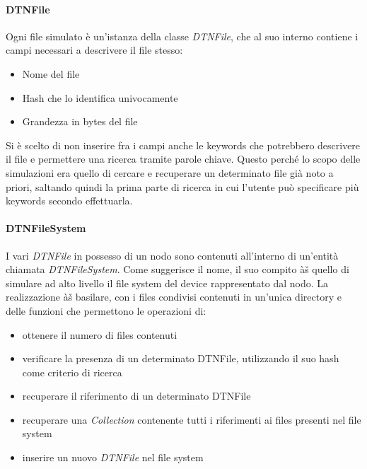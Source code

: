 \paragraph{DTNFile}
Ogni file simulato è un'istanza della classe \textit{DTNFile}, che al suo interno contiene i campi necessari a descrivere il file stesso:

\begin{itemize}
\item Nome del file
\item Hash che lo identifica univocamente
\item Grandezza in bytes del file
\end{itemize}

Si è scelto di non inserire fra i campi anche le keywords che potrebbero descrivere il file e permettere una ricerca tramite parole chiave. Questo perché lo scopo delle simulazioni era quello di cercare e recuperare un determinato file già  noto a priori, saltando quindi la prima parte di ricerca in cui l'utente può specificare più keywords secondo effettuarla.

\paragraph{DTNFileSystem}
I vari \textit{DTNFile} in possesso di un nodo sono contenuti all'interno di un'entità  chiamata \textit{DTNFileSystem}. Come suggerisce il nome, il suo compito àš quello di simulare ad alto livello il file system del device rappresentato dal nodo. La realizzazione àš basilare, con i files condivisi contenuti in un'unica directory e delle funzioni che permettono le operazioni di:
\begin{itemize}
\item ottenere il numero di files contenuti
\item verificare la presenza di un determinato DTNFile, utilizzando il suo hash come criterio di ricerca
\item recuperare il riferimento di un determinato DTNFile
\item recuperare una \textit{Collection} contenente tutti i riferimenti ai files presenti nel file system
\item inserire un nuovo \textit{DTNFile} nel file system
\end{itemize}

